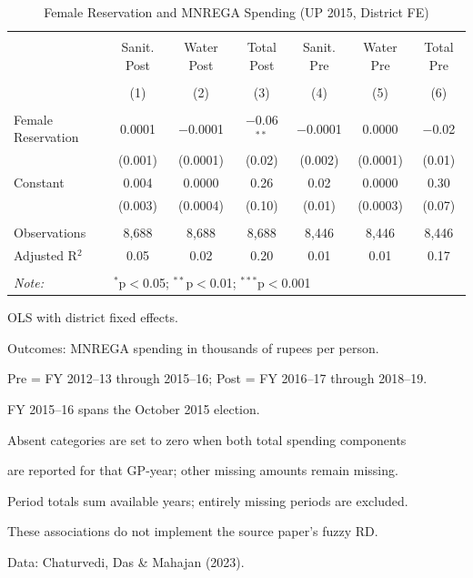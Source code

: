 \begin{table}[!htbp]
\centering
\begin{threeparttable}

  \caption{Female Reservation and MNREGA Spending (UP 2015, District FE)} 
  \label{tab:mnrega_up_cdm_ols_fe} 
\scriptsize 
\begin{tabular}{@{\extracolsep{0pt}}lcccccc} 
\\[-1.8ex]\hline 
\hline \\[-1.8ex] 
 & Sanit. Post & Water Post & Total Post & Sanit. Pre & Water Pre & Total Pre \\ 
\\[-1.8ex] & (1) & (2) & (3) & (4) & (5) & (6)\\ 
\hline \\[-1.8ex] 
 Female Reservation & 0.0001 & $-$0.0001 & $-$0.06$^{**}$ & $-$0.0001 & 0.0000 & $-$0.02 \\ 
  & (0.001) & (0.0001) & (0.02) & (0.002) & (0.0001) & (0.01) \\ 
  Constant & 0.004 & 0.0000 & 0.26 & 0.02 & 0.0000 & 0.30 \\ 
  & (0.003) & (0.0004) & (0.10) & (0.01) & (0.0003) & (0.07) \\ 
 \hline \\[-1.8ex] 
Observations & 8,688 & 8,688 & 8,688 & 8,446 & 8,446 & 8,446 \\ 
Adjusted R$^{2}$ & 0.05 & 0.02 & 0.20 & 0.01 & 0.01 & 0.17 \\ 
\hline 
\hline \\[-1.8ex] 
\textit{Note:}  & \multicolumn{6}{l}{$^{*}$p$<$0.05; $^{**}$p$<$0.01; $^{***}$p$<$0.001} \\ 
\end{tabular} 
\begin{tablenotes}[flushleft]
\scriptsize
\item[] OLS with district fixed effects.
\item[] Outcomes: MNREGA spending in thousands of rupees per person.
\item[] Pre = FY 2012--13 through 2015--16; Post = FY 2016--17 through 2018--19.
\item[] FY 2015--16 spans the October 2015 election.
\item[] Absent categories are set to zero when both total spending components
\item[] are reported for that GP-year; other missing amounts remain missing.
\item[] Period totals sum available years; entirely missing periods are excluded.
\item[] These associations do not implement the source paper's fuzzy RD.
\item[] Data: Chaturvedi, Das \& Mahajan (2023).
\end{tablenotes}
\end{threeparttable}
\end{table}
